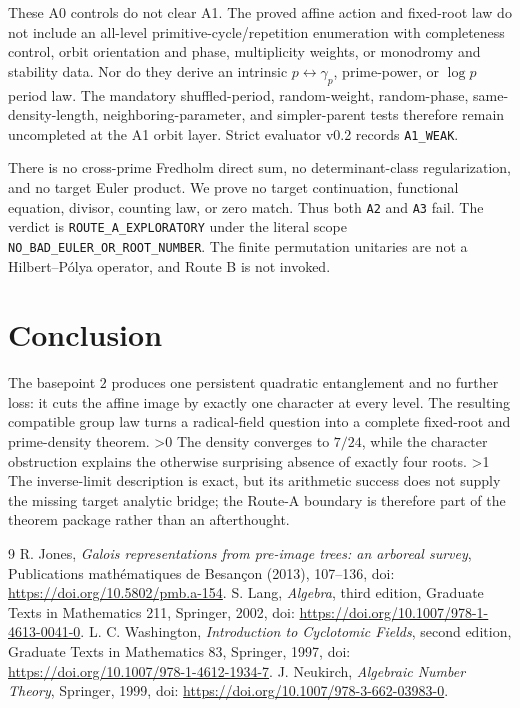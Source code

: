 \documentclass[10pt]{article}
\newcommand{\Scope}{\texttt{NO\_BAD\_EULER\_OR\_ROOT\_NUMBER}}
\begin{document}
These A0 controls do not clear A1.  The proved affine action and fixed-root
law do not include an all-level primitive-cycle/repetition enumeration with
completeness control, orbit orientation and phase, multiplicity weights, or
monodromy and stability data.  Nor do they derive an intrinsic
$p\leftrightarrow\gamma_p$, prime-power, or $\log p$ period law.  The
mandatory shuffled-period, random-weight, random-phase, same-density-length,
neighboring-parameter, and simpler-parent tests therefore remain uncompleted
at the A1 orbit layer.  Strict evaluator v0.2 records \texttt{A1\_WEAK}.

There is no cross-prime Fredholm direct sum, no determinant-class
regularization, and no target Euler product.  We prove no target
continuation, functional equation, divisor, counting law, or zero match.
Thus both \texttt{A2} and \texttt{A3} fail.  The verdict is
\texttt{ROUTE\_A\_EXPLORATORY} under the literal scope \Scope.
The finite permutation unitaries are not a Hilbert--P\'olya operator, and
Route B is not invoked.

\begin{center}
\end{center}
\fi

\section{Conclusion}
The basepoint $2$ produces one persistent quadratic entanglement and no
further loss: it cuts the affine image by exactly one character at every
level.  The resulting compatible group law turns a radical-field question
into a complete fixed-root and prime-density theorem.
\ifnum\CRevisionRound>0
The density converges to $7/24$, while the character obstruction explains
the otherwise surprising absence of exactly four roots.
\fi
\ifnum\CRevisionRound>1
The inverse-limit description is exact, but its arithmetic success does
not supply the missing target analytic bridge; the Route-A boundary is
therefore part of the theorem package rather than an afterthought.
\fi

\begin{thebibliography}{9}\small
{} R. Jones,
\emph{Galois representations from pre-image trees: an arboreal survey},
Publications math\'ematiques de Besan\c{c}on (2013), 107--136,
doi: \url{https://doi.org/10.5802/pmb.a-154}.
 S. Lang, \emph{Algebra}, third edition, Graduate Texts in
Mathematics 211, Springer, 2002,
doi: \url{https://doi.org/10.1007/978-1-4613-0041-0}.
 L. C. Washington,
\emph{Introduction to Cyclotomic Fields}, second edition, Graduate Texts
in Mathematics 83, Springer, 1997,
doi: \url{https://doi.org/10.1007/978-1-4612-1934-7}.
 J. Neukirch, \emph{Algebraic Number Theory}, Springer,
1999, doi: \url{https://doi.org/10.1007/978-3-662-03983-0}.
\end{thebibliography}
\end{document}
